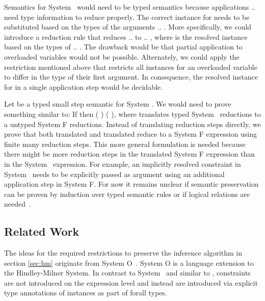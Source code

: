 \noindent Semantics for System \Fo\ would need to be typed semantics because applications      $..$   need type information to reduce properly.
The correct instance for  needs to be substituted based on the types of the arguments  $..$ . 
More specifically, we could introduce a reduction rule  that reduces      $..$   to     $..$  , where  is the resolved instance based on the types of  $..$ . The drawback would be that partial application to overloaded variables would not be possible.
Alternately, we could apply the restriction mentioned above that restricts all instances for an overloaded variable  to differ in the type of their first argument.
In consequence, the resolved instance for  in a single application step     would be decidable.

\noindent Let    be a typed small step semantic for System \Fo. 
We would need to prove something similar to: If    then  \Constr{[}  \Constr{]} (   )  (   ), where  translates typed System \Fo\ reductions to a untyped System F reductions.
Instead of translating reduction steps directly, we prove that both translated  and translated  reduce to a System F expression  using finite many reduction steps.
This more general formulation is needed because there might be more reduction steps in the translated System F expression than in the System \Fo\ expression. 
For example, an implicitly resolved constraint in System \Fo\ needs to be explicitly passed as argument using an additional application step in System F. 
For now it remains unclear if semantic preservation can be proven by induction over typed semantic rules or if logical relations are needed~\cite{logrel}.

\subsection{Related Work}
The ideas for the required restrictions to preserve the inference algorithm in section \ref{sec:hm} originate from System O~\cite{syso}. 
System O is a language extension to the Hindley-Milner System. 
In contrast to System \Fo\ and similar to \HMo, constraints are not introduced on the expression level and instead are introduced via explicit type annotations of instances as part of forall types. 

